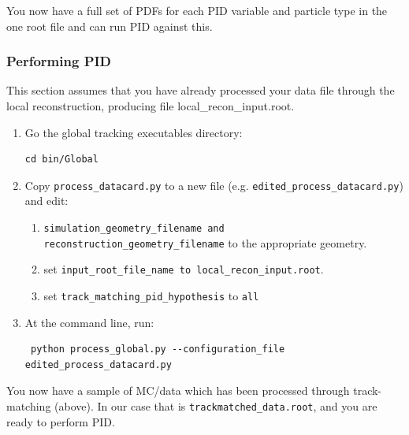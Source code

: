 \documentclass[a4paper,10pt]{article}
\begin{document}
You now have a full set of PDFs for each PID variable and particle type in the one root file and can run PID against this.

\subsubsection{Performing PID}
This section assumes that you have already processed your data file through the local reconstruction,
producing file local\_recon\_input.root.

\begin{enumerate}
\item Go the global tracking executables directory:
\begin{lstlisting}
cd bin/Global
\end{lstlisting}

\item{Copy \texttt{process\_datacard.py} to a new file (e.g. \texttt{edited\_process\_datacard.py}) and edit:}
\begin{enumerate}[label=(\alph*)]
\item{\texttt{simulation\_geometry\_filename and reconstruction\_geometry\_filename} to the
appropriate geometry.}
\item{set \texttt{input\_root\_file\_name to local\_recon\_input.root}.}
\item{set \texttt{track\_matching\_pid\_hypothesis} to \texttt{all}}
\end{enumerate}

\item At the command line, run:
\begin{lstlisting}
 python process_global.py --configuration_file edited_process_datacard.py
\end{lstlisting}
\end{enumerate}

You now have a sample of MC/data which has been processed through track-matching (above). In our case that is \texttt{trackmatched\_data.root}, and you are ready to perform PID.
\end{document}
